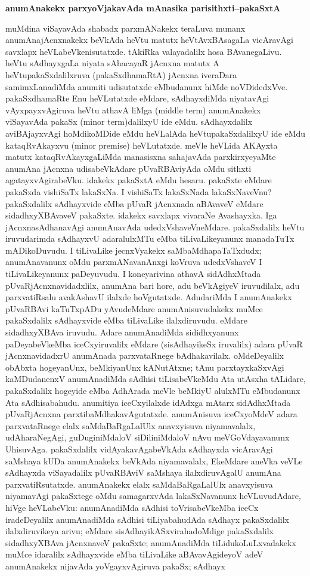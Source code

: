 \bigskip
\begin{center}
{\Large\bf anumAnakekx parxyoVjakavAda mAnasika parisithxti--pakaSxtA}
\end{center}

muMdina viSayavAda shabadx parxmANakekx teraLuva munanx anumAnajAcnxnakekx beVkAda heVtu matutx heVtAvxBAsagaLa vicAravAgi savxlapx heVLabeVkenisutatxde. tAkiRka valayadalilx hosa BAvanegaLivu. heVtu sAdhayxgaLa niyata sAhacayaR jAcnxna matutx A heVtupakaSxdalilxruva (pakaSxdhamaRtA) jAcnxna iveraDara samimxLanadiMda anumiti udisutatxde eMbudanunx hiMde noVDidedxVve. pakaSxdhamaRte Enu heVLutatxde eMdare, sAdhayxdiMda niyatavAgi vAyxpayxvAgiruva heVtu athavA liMga ({\rm middle term}) anumAnakekx viSayavAda pakaSx {\rm(minor term)}dalilxyU ide eMdu. sAdhayxdalilx aviBAjayxvAgi hoMdikoMDide eMdu heVLalAda heVtupakaSxdalilxyU ide eMdu kataqRvAkayxvu {\rm(minor premise)} heVLutatxde. meVle heVLida AKAyxta matutx kataqRvAkayxgaLiMda manasisxna sahajavAda parxkirxyeyaMte anumAna jAcnxna udisabeVkAdare pUvaRBAviyAda oMdu sithxti agatayxvAgirabeVku. idakekx pakaSxtA eMdu hesaru. pakaSxte eMdare pakaSxda vishiSaTx lakaSxNa. I vishiSaTx lakaSxNada lakaSxNaveVnu? pakaSxdalilx sAdhayxvide eMba pUvaR jAcnxnada aBAvaveV eMdare sidadhxyXBAvaveV pakaSxte. idakekx savxlapx vivaraNe Avashayxka. Iga jAcnxnasAdhanavAgi anumAnavAda udedxVshaveVneMdare. pakaSxdalilx heVtu iruvudarimda sAdhayxvU adaralulxMTu eMba tiLivaLikeyanunx manadaTuTx mADikoDuvudu. I tiLivaLike jecnxVyakekx saMbaMdhapaTaTxdudx; anumAnavanunx oMdu parxmANavanAnxgi koVruva udedxVshaveV I tiLivaLikeyanunx paDeyuvudu. I koneyarivina athavA sidAdhxMtada pUvaRjAcnxnavidadxlilx, anumAna bari hore, adu beVkAgiyeV iruvudilalx, adu parxvatiRsalu avakAshavU ilalxde hoVgutatxde. AdudariMda I anumAnakekx pUvaRBAvi kaTuTxpADu yAvudeMdare anumAnisuvudakekx muMce pakaSxdalilx sAdhayxvide eMba tiLivaLike ilalxdiruvudu. eMdare sidadhxyXBAva iruvudu. Adare anumAnadiMda sididhxyanunx paDeyabeVkeMba iceCxyiruvalilx eMdare (sisAdhayikeSx iruvalilx) adara pUvaR jAcnxnavidadxrU anumAnada parxvataRnege bAdhakavilalx. oMdeDeyalilx obAbxta hogeyanUnx, beMkiyanUnx kANutAtxne; tAnu parxtayxkaSxvAgi kaMDudanenxV anumAnadiMda sAdhisi tiLisabeVkeMdu Ata utAsxha tALidare, pakaSxdalilx hogeyide eMba AdhArada meVle beMkiyU alulxMTu eMbudanunx Ata sAdhisabahudu. anumitiya iceCxyilalxde idAdxga mAtarx sidAdhxMtada pUvaRjAcnxna parxtibaMdhakavAgutatxde. anumAnisuva iceCxyoMdeV adara parxvataRnege elalx saMdaBaRgaLalUlx anavxyisuva niyamavalalx, udAharaNegAgi, guDuginiMdaloV siDiliniMdaloV nAvu meVGoVdayavanunx UhisuvAga. pakaSxdalilx vidAyakavAgabeVkAda sAdhayxda vicAravAgi saMshaya kUDa anumAnakekx beVkAda niyamavalalx, EkeMdare aneVka veVLe sAdhayxda viSayadalilx pUvaRBAviV saMshaya ilalxdiruvAgalU anumAna parxvatiRsutatxde. anumAnakekx elalx saMdaBaRgaLalUlx anavxyisuva niyamavAgi pakaSxtege oMdu samagarxvAda lakaSxNavanunx heVLuvudAdare, hiVge heVLabeVku: anumAnadiMda sAdhisi toVrisabeVkeMba iceCx iradeDeyalilx anumAnadiMda sAdhisi tiLiyabahudAda sAdhayx pakaSxdalilx ilalxdiruvikeya arivu; eMdare sisAdhayikASxvirahadoMdige pakaSxdalilx sidadhxyXBAva jAcnxnaveV pakaSxte; anumAnadiMda tiLidukoLuLxvadakekx muMce idaralilx sAdhayxvide eMba tiLivaLike aBAvavAgideyoV adeV anumAnakekx nijavAda yoVgayxvAgiruva pakaSx; sAdhayx 